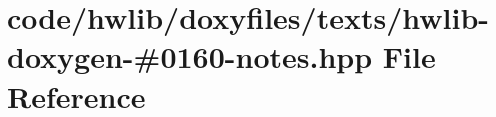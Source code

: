 \hypertarget{hwlib-doxygen-#0160-notes_8hpp}{}\section{code/hwlib/doxyfiles/texts/hwlib-\/doxygen-\/\#0160-\/notes.hpp File Reference}
\label{hwlib-doxygen-#0160-notes_8hpp}
